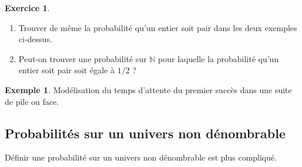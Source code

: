 \documentclass[french]{article}
\newcommand{\N}{\mathbb{N}}
\theoremstyle{plain}
\theoremstyle{definition}
\newtheorem*{ex}{Exemple}
\newtheorem{exo}{Exercice}
\theoremstyle{remark}
\begin{document}
\begin{exo}
	\begin{enumerate}
		\item Trouver de même la probabilité qu'un entier soit pair dans les deux exemples ci-dessus.
		\item Peut-on trouver une probabilité sur 
		$\N$ pour laquelle la probabilité qu'un entier soit pair soit égale à $1/2$ ?
	\end{enumerate}
\end{exo}

\begin{ex}
	Modélisation du temps d'attente du premier succès dans une suite de pile ou face.
\end{ex}

\subsection{Probabilités sur un univers non dénombrable}

Définir une probabilité sur un univers non dénombrable est plus compliqué.
\end{document}
